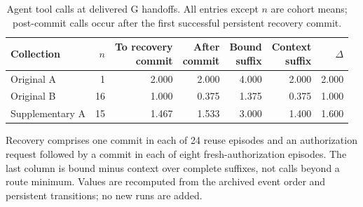 \begin{table}[tbp]
\caption{Agent tool calls at delivered G handoffs. All entries except $n$ are cohort means; post-commit calls occur after the first successful persistent recovery commit.}\label{tab:recovery-decomposition}
\centering\small
\setlength{\tabcolsep}{3pt}
\begin{tabular*}{\textwidth}{@{\extracolsep{\fill}}lrrrrrr@{}}
\toprule
Collection & $n$ & \shortstack{To recovery\\commit} & \shortstack{After\\commit} & \shortstack{Bound\\suffix} & \shortstack{Context\\suffix} & $\Delta$ \\
\midrule
Original A & 1 & 2.000 & 2.000 & 4.000 & 2.000 & 2.000 \\
Original B & 16 & 1.000 & 0.375 & 1.375 & 0.375 & 1.000 \\
Supplementary A & 15 & 1.467 & 1.533 & 3.000 & 1.400 & 1.600 \\
\bottomrule
\end{tabular*}
\par\smallskip\begin{minipage}{\textwidth}\small Recovery comprises one commit in each of 24 reuse episodes and an authorization request followed by a commit in each of eight fresh-authorization episodes. The last column is bound minus context over complete suffixes, not calls beyond a route minimum. Values are recomputed from the archived event order and persistent transitions; no new runs are added.\end{minipage}
\end{table}
